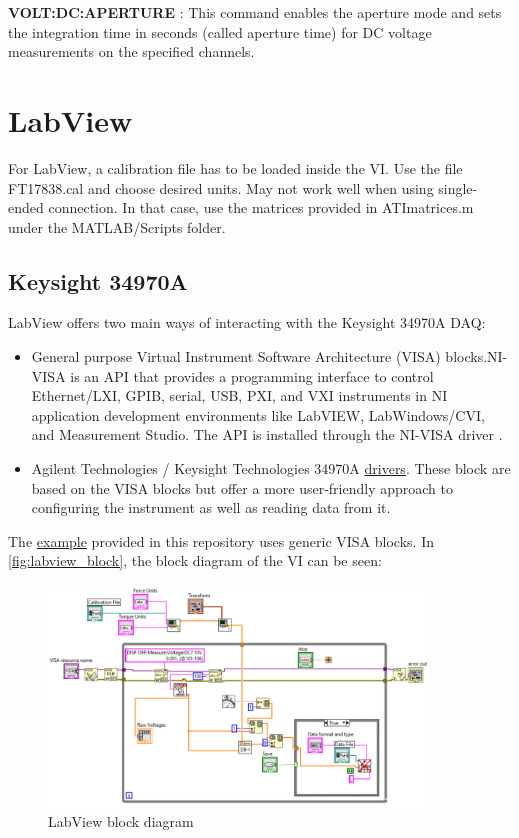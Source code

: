 \documentclass[a4paper]{article}
\begin{document}
\textbf{VOLT:DC:APERTURE} : This command enables the aperture mode and sets the integration time in seconds (called aperture time) for DC voltage measurements on the specified channels.


\section{LabView}

For LabView, a calibration file has to be loaded inside the VI. Use the file FT17838.cal and choose desired units. May not work well when using single-ended connection. In that case, use the matrices provided in ATImatrices.m under the MATLAB/Scripts folder.
 
\subsection{Keysight 34970A}

LabView offers two main ways of interacting with the Keysight 34970A DAQ:

\begin{itemize}
	\item General purpose Virtual Instrument Software Architecture (VISA) blocks.NI-VISA is an API that provides a programming interface to control Ethernet/LXI, GPIB, serial, USB, PXI, and VXI instruments in NI application development environments like LabVIEW, LabWindows/CVI, and Measurement Studio. The API is installed through the NI-VISA driver \cite{NIVISA}.
	\item Agilent Technologies / Keysight Technologies 34970A \hyperref{http://sine.ni.com/apps/utf8/niid_web_display.model_page?p_model_id=5547}{category}{name}{drivers}. These block are based on the VISA blocks but offer a more user-friendly approach to configuring the instrument as well as reading data from it. 
\end{itemize}

The \hyperref{https://github.com/IrisDuMutel/ATIMini40_software/tree/master/LabView}{cat1}{visa}{example}  provided in this repository uses generic VISA blocks. In \autoref{fig:labview_block}, the block diagram of the VI can be seen:

\begin{figure}[!h]
	\centering
	\includegraphics[width=0.9\textwidth]{labview_block.png}
	\caption{LabView block diagram}
	\label{fig:labview_block}
\end{figure}
\end{document}

